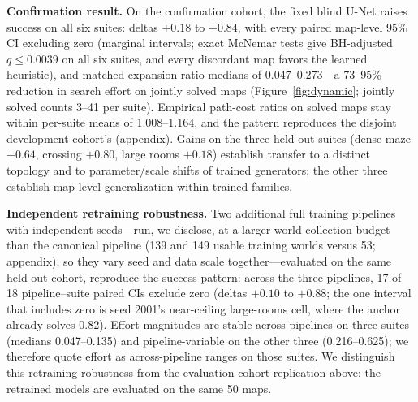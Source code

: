\documentclass[letterpaper]{article} %
\begin{document}
\textbf{Confirmation result.} On the confirmation cohort, the fixed blind U-Net raises success on all six suites: deltas $+0.18$ to $+0.84$, with every paired map-level 95\% CI excluding zero (marginal intervals; exact McNemar tests give BH-adjusted $q \leq 0.0039$ on all six suites, and every discordant map favors the learned heuristic), and matched expansion-ratio medians of 0.047--0.273---a 73--95\% reduction in search effort on jointly solved maps (Figure~\ref{fig:dynamic}; jointly solved counts 3--41 per suite). Empirical path-cost ratios on solved maps stay within per-suite means of 1.008--1.164, and the pattern reproduces the disjoint development cohort's (appendix). Gains on the three held-out suites (dense maze $+0.64$, crossing $+0.80$, large rooms $+0.18$) establish transfer to a distinct topology and to parameter/scale shifts of trained generators; the other three establish map-level generalization within trained families.

\textbf{Independent retraining robustness.} Two additional full training pipelines with independent seeds---run, we disclose, at a larger world-collection budget than the canonical pipeline (139 and 149 usable training worlds versus 53; appendix), so they vary seed and data scale together---evaluated on the same held-out cohort, reproduce the success pattern: across the three pipelines, 17 of 18 pipeline--suite paired CIs exclude zero (deltas $+0.10$ to $+0.88$; the one interval that includes zero is seed 2001's near-ceiling large-rooms cell, where the anchor already solves 0.82). Effort magnitudes are stable across pipelines on three suites (medians 0.047--0.135) and pipeline-variable on the other three (0.216--0.625); we therefore quote effort as across-pipeline ranges on those suites. We distinguish this retraining robustness from the evaluation-cohort replication above: the retrained models are evaluated on the same 50 maps.
\end{document}
